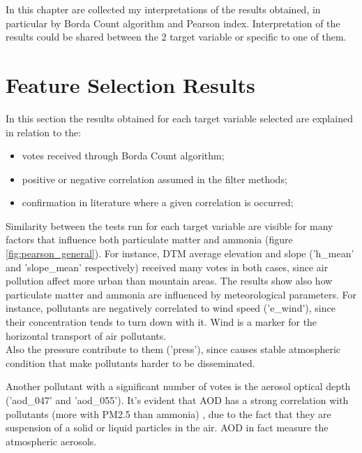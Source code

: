 In this chapter are collected my interpretations of the results obtained, in particular by Borda Count algorithm and Pearson index. Interpretation of the results could be shared between the 2 target variable or specific to one of them.
\section{Feature Selection Results}
In this section the results obtained for each target variable selected are explained in relation to the:
\begin{itemize}
    \item votes received through Borda Count algorithm;
    \item positive or negative correlation assumed in the filter methods;
    \item confirmation in literature where a given correlation is occurred; 
\end{itemize}
Similarity between the tests run for each target variable are visible for many factors that influence both particulate matter and ammonia (figure \ref{fig:pearson_general}).
For instance, DTM average elevation and slope ('h\_mean' and 'slope\_mean' respectively) received many votes in both cases, since air pollution affect more urban than mountain areas.
The results show also how particulate matter and ammonia are influenced by meteorological parameters.
For instance, pollutants are negatively correlated to wind speed ('e\_wind'), since their concentration tends to turn down with it. Wind is a marker for the horizontal transport of air pollutants.\\
Also the pressure contribute to them ('press'), since causes stable atmospheric condition that make pollutants harder to be disseminated. 

Another pollutant with a significant number of votes is the aerosol optical depth ('aod\_047' and 'aod\_055'). It's evident that AOD has a strong correlation with pollutants (more with PM2.5 than ammonia) , due to the fact that they are suspension of a solid or liquid particles in the air. AOD in fact measure the atmospheric aerosols.
